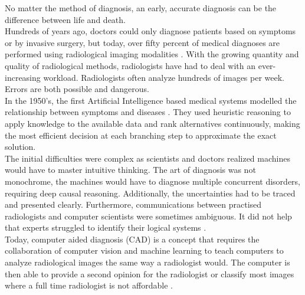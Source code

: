 No matter the method of diagnosis, an early, accurate diagnosis can be the difference between life and death.\newline
\\
Hundreds of years ago, doctors could only diagnose patients based on symptoms or by invasive surgery, but today, over fifty percent of medical diagnoses are performed using radiological imaging modalities \cite{1}. With the growing quantity and quality of radiological methods, radiologists have had to deal with an ever-increasing workload. Radiologists often analyze hundreds of images per week. Errors are both possible and dangerous.\newline
\\
In the 1950’s, the first Artificial Intelligence based medical systems modelled the relationship between symptoms and diseases \cite{2}. They used heuristic reasoning to apply knowledge to the available data and rank alternatives continuously, making the most efficient decision at each branching step to approximate the exact solution.\newline
\\
The initial difficulties were complex as scientists and doctors realized machines would have to master intuitive thinking. The art of diagnosis was not monochrome, the machines would have to diagnose multiple concurrent disorders, requiring deep causal reasoning. Additionally, the uncertainties had to be traced and presented clearly. Furthermore, communications between practised radiologists and computer scientists were sometimes ambiguous. It did not help that experts struggled to identify their logical systems \cite{2}. \newline
\\
Today, computer aided diagnosis (CAD) is a concept that requires the collaboration of computer vision and machine learning to teach computers to analyze radiological images the same way a radiologist would. The computer is then able to provide a second opinion for the radiologist or classify most images where a full time radiologist is not affordable \cite{3}.


